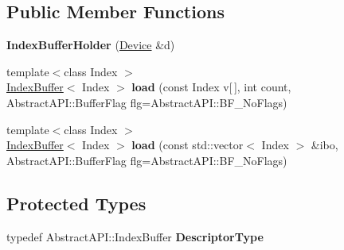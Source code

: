 \subsection*{Public Member Functions}
\begin{DoxyCompactItemize}
\item 
\hypertarget{class_tempest_1_1_index_buffer_holder_a64b7d85d2ce75bdcb01e6548c6b7a883}{{\bfseries Index\+Buffer\+Holder} (\hyperlink{class_tempest_1_1_device}{Device} \&d)}\label{class_tempest_1_1_index_buffer_holder_a64b7d85d2ce75bdcb01e6548c6b7a883}

\item 
\hypertarget{class_tempest_1_1_index_buffer_holder_a70c5e61afb62de78922db86fd55f80af}{{\footnotesize template$<$class Index $>$ }\\\hyperlink{class_tempest_1_1_index_buffer}{Index\+Buffer}$<$ Index $>$ {\bfseries load} (const Index v\mbox{[}$\,$\mbox{]}, int count, Abstract\+A\+P\+I\+::\+Buffer\+Flag flg=Abstract\+A\+P\+I\+::\+B\+F\+\_\+\+No\+Flags)}\label{class_tempest_1_1_index_buffer_holder_a70c5e61afb62de78922db86fd55f80af}

\item 
\hypertarget{class_tempest_1_1_index_buffer_holder_a7c5569966fea598b70aafcca93475733}{{\footnotesize template$<$class Index $>$ }\\\hyperlink{class_tempest_1_1_index_buffer}{Index\+Buffer}$<$ Index $>$ {\bfseries load} (const std\+::vector$<$ Index $>$ \&ibo, Abstract\+A\+P\+I\+::\+Buffer\+Flag flg=Abstract\+A\+P\+I\+::\+B\+F\+\_\+\+No\+Flags)}\label{class_tempest_1_1_index_buffer_holder_a7c5569966fea598b70aafcca93475733}

\end{DoxyCompactItemize}
\subsection*{Protected Types}
\begin{DoxyCompactItemize}
\item 
\hypertarget{class_tempest_1_1_index_buffer_holder_aa77ffbcc7d92ae0b5b469394120be7e8}{typedef Abstract\+A\+P\+I\+::\+Index\+Buffer {\bfseries Descriptor\+Type}}\label{class_tempest_1_1_index_buffer_holder_aa77ffbcc7d92ae0b5b469394120be7e8}

\end{DoxyCompactItemize}
